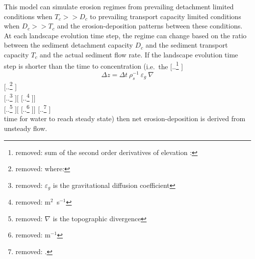 \documentclass[gmd, manuscript]{copernicus}
\providecommand{\DIFadd}[1]{{\protect\color{blue} \sf #1}} %
\providecommand{\DIFdel}[1]{{\protect\color{red} [..\footnote{removed: #1} ]}} %
\providecommand{\DIFaddbegin}{} %
\providecommand{\DIFaddend}{} %
\providecommand{\DIFdelbegin}{} %
\providecommand{\DIFdelend}{} %
\begin{document}

\DIFadd{This model can simulate erosion regimes 
from prevailing detachment limited conditions when $T_c >> D_c$ 
to prevailing transport capacity limited conditions when $D_c >> T_c$
and the erosion-deposition patterns between these conditions.
At each landscape evolution time step, the regime can change based on 
the ratio between the sediment detachment capacity $D_c$
and the sediment transport capacity $T_c$ and the actual sediment flow rate.
If the landscape evolution time step is shorter than the time to concentration 
(}\DIFaddend i.e.~the \DIFdelbegin \DIFdel{sum of the second order derivatives of elevation
\citep{thaxton2004}:
}\begin{displaymath}
\label{eq:grav_diffusion} 
{\Delta z = \Delta t ~ \rho_s^{-1} ~ \varepsilon_g ~ \nabla}
\end{displaymath}
{\DIFdel{\small
\noindent
where: }\\
\DIFdel{\noindent
\hspace*{0.5em} $\varepsilon_g$ is the gravitational diffusion coefficient }[\DIFdel{\unit{m}$^{2}$~\unit{s}$^{-1}$}]\\ \DIFdel{\hspace*{0.5em} $\nabla$ is the topographic divergence }[\DIFdel{\unit{m}$^{-1}$}]\DIFdel{.}\\
}
\DIFdelend \DIFaddbegin \DIFadd{time for water to reach steady state)
then net erosion-deposition is derived from unsteady flow.
}\DIFaddend 

\end{document}
